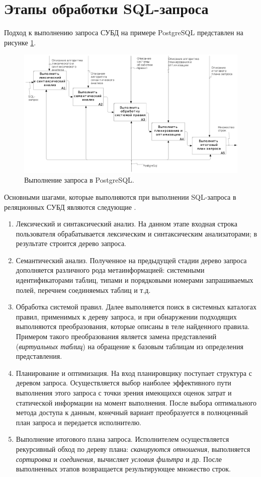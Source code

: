 \section{Этапы обработки SQL-запроса}
Подход к выполнению запроса СУБД на примере PostgreSQL представлен на рисунке \ref{image:query_plan}.
\begin{figure}[H]
	\centering
	{
		\includegraphics[scale=0.38]{./images/02_A0.png}
		\caption{Выполнение запроса в PostgreSQL.}
	    \label{image:query_plan}
    }
\end{figure}

Основными шагами, которые выполняются при выполнении SQL-запроса в реляционных СУБД являются следующие \cite{stages_sql_query}.

\begin{enumerate}
	\item Лексический и синтаксический анализ. На данном этапе входная строка пользователя обрабатывается лексическим и синтаксическим анализаторами; в результате строится дерево запроса.
	\item Семантический анализ. Полученное на предыдущей стадии дерево запроса дополняется различного рода метаинформацией: системными идентификаторами таблиц, типами и порядковыми номерами запрашиваемых полей, перечнем соединяемых таблиц и т.д.
	\item Обработка системой правил. Далее выполняется поиск в системных каталогах правил, применимых к дереву запроса, и при обнаружении подходящих выполняются преобразования, которые описаны в теле найденного правила. Примером такого преобразования является замена представлений (\textit{виртуальных таблиц}) на обращение к базовым таблицам из определения представления.
	\item Планирование и оптимизация. На вход планировщику поступает структура с деревом запроса. Осуществляется выбор наиболее эффективного пути выполнения этого запроса с точки зрения имеющихся оценок затрат и статической информации на момент выполнения.  После выбора оптимального метода доступа к данным, конечный вариант преобразуется в полноценный план запроса и передается исполнителю. 
	\item Выполнение итогового плана запроса. Исполнителем осуществляется рекурсивный обход по дереву плана: \textit{сканируются отношения}, выполняется \textit{сортировка} и \textit{соединения}, вычисляет \textit{условия фильтра} и др. После выполненных этапов возвращается результирующее множество строк.
\end{enumerate}

